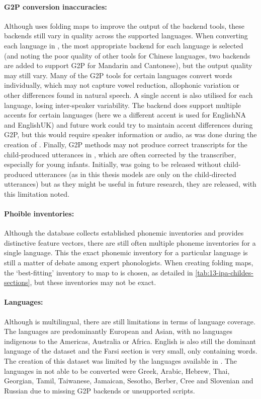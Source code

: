 \paragraph{G2P conversion inaccuracies:} Although \gpp uses folding maps to improve the output of the backend tools, these backends still vary in quality across the supported languages. When converting each language in \childes, the most appropriate backend for each language is selected (and noting the poor quality of other tools for Chinese languages, two backends are added to support G2P for Mandarin and Cantonese), but the output quality may still vary. Many of the G2P tools for certain languages convert words individually, which may not capture vowel reduction, allophonic variation or other differences found in natural speech. A single accent is also utilised for each language, losing inter-speaker variability. The \phonemizer backend does support multiple accents for certain languages (here we a different accent is used for EnglishNA and EnglishUK) and future work could try to maintain accent differences during G2P, but this would require speaker information or audio, as was done during the creation of  \citep{coleman2012audio}. Finally, G2P methods may not produce correct transcripts for the child-produced utterances in \childes, which are often corrected by the transcriber, especially for young infants. Initially, \ipachildes was going to be released without child-produced utterances (as in this thesis models are only on the child-directed utterances) but as they might be useful in future research, they are released, with this limitation noted.

\paragraph{Phoible inventories:} Although the \phoible database collects established phonemic inventories and provides distinctive feature vectors, there are still often multiple phoneme inventories for a single language. This the exact phonemic inventory for a particular language is still a matter of debate among expert phonologists. When creating folding maps, the `best-fitting' inventory to map to is chosen, as detailed in \cref{tab:13-ipa-childes-sections}, but these inventories may not be exact.

\paragraph{Languages:} Although \ipachildes is multilingual, there are still limitations in terms of language coverage. The languages are predominantly European and Asian, with no languages indigenous to the Americas, Australia or Africa. English is also still the dominant language of the dataset and the Farsi section is very small, only containing  words. The creation of this dataset was limited by the languages available in \childes. The languages in \childes not able to be converted were Greek, Arabic, Hebrew, Thai, Georgian, Tamil, Taiwanese, Jamaican, Sesotho, Berber, Cree and Slovenian and Russian due to missing G2P backends or unsupported scripts.

